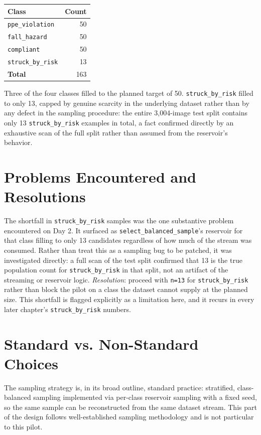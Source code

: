 \begin{center}
\begin{tabular}{lr}
\toprule
\textbf{Class} & \textbf{Count} \\
\midrule
\texttt{ppe\_violation} & 50 \\
\texttt{fall\_hazard} & 50 \\
\texttt{compliant} & 50 \\
\texttt{struck\_by\_risk} & 13 \\
\midrule
\textbf{Total} & 163 \\
\bottomrule
\end{tabular}
\end{center}

Three of the four classes filled to the planned target of 50. \texttt{struck\_by\_risk} filled to
only 13, capped by genuine scarcity in the underlying dataset rather than by any defect in the
sampling procedure: the entire 3{,}004-image test split contains only 13 \texttt{struck\_by\_risk}
examples in total, a fact confirmed directly by an exhaustive scan of the full split rather than
assumed from the reservoir's behavior.

\section{Problems Encountered and Resolutions}

The shortfall in \texttt{struck\_by\_risk} samples was the one substantive problem encountered on
Day 2. It surfaced as \texttt{select\_balanced\_sample}'s reservoir for that class filling to only
13 candidates regardless of how much of the stream was consumed. Rather than treat this as a
sampling bug to be patched, it was investigated directly: a full scan of the test split confirmed
that 13 is the true population count for \texttt{struck\_by\_risk} in that split, not an artifact
of the streaming or reservoir logic. \emph{Resolution}: proceed with \texttt{n=13} for
\texttt{struck\_by\_risk} rather than block the pilot on a class the dataset cannot supply at the
planned size. This shortfall is flagged explicitly as a limitation here, and it recurs in every
later chapter's \texttt{struck\_by\_risk} numbers.

\section{Standard vs. Non-Standard Choices}

The sampling strategy is, in its broad outline, standard practice: stratified, class-balanced
sampling implemented via per-class reservoir sampling with a fixed seed, so the same sample can be
reconstructed from the same dataset stream. This part of the design follows well-established
sampling methodology and is not particular to this pilot.

